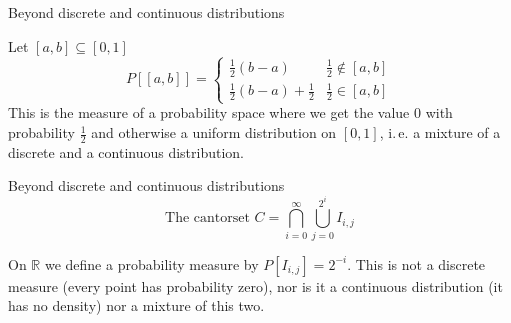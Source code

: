 \documentclass[compress]{beamer}
\newcommand{\RR}{\mathbb{R}}
\begin{document}
\begin{frame}{Beyond discrete and continuous distributions}
  \begin{example}
    Let $[a,b]\subseteq [0,1]$
    \[
      P[[a,b]]=
      \begin{cases}
        \tfrac12(b-a) & \tfrac12 \notin [a,b]\\
        \tfrac12(b-a) + \tfrac12 & \frac12 \in [a,b]
      \end{cases}
    \]
    This is the measure of a probability space where we get the value $0$ with
    probability $\tfrac12$ and otherwise a uniform distribution on $[0,1]$,
    i.\,e. a mixture of a discrete and a continuous distribution.
  \end{example}
\end{frame}

\begin{frame}{Beyond discrete and continuous distributions}
  \[\text{The cantorset } C = \bigcap_{i=0}^\infty \bigcup_{j=0}^{2^i} I_{i,j}\]
  \begin{center}
    \begin{tikzpicture}
      
    \end{tikzpicture}
  \end{center}
  \pause
  \begin{example}
    On $\RR$ we define a probability measure by $P[I_{i,j}] = 2^{-i}$. This is
    not a discrete measure (every point has probability zero), nor is it a
    continuous distribution (it has no density) nor a mixture of this two.
  \end{example}
\end{frame}
\end{document}

